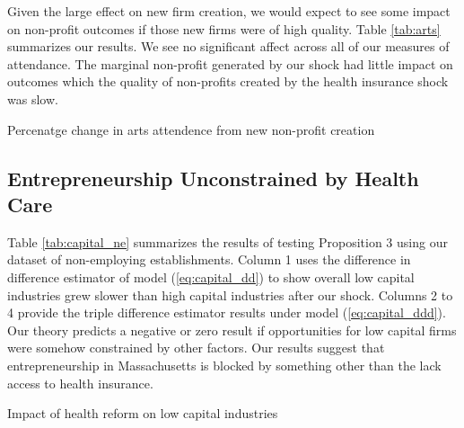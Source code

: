 \documentclass[12pt]{article}
\begin{document}
Given the large effect on new firm creation, we would expect to see some impact on non-profit outcomes if those new firms were of high quality. Table \ref{tab:arts} summarizes our results. We see no significant affect across all of our measures of attendance. The marginal non-profit generated by our shock had little impact on outcomes which the quality of non-profits created by the health insurance shock was slow. 

\begin{table}[H]
	\footnotesize
	\centering
	\caption{Percenatge change in arts attendence from new non-profit creation}
	
	\label{tab:arts}
\end{table}

\subsection{Entrepreneurship Unconstrained by Health Care}

Table \ref{tab:capital_ne} summarizes the results of testing Proposition 3 using our dataset of non-employing establishments. Column 1 uses the difference in difference estimator of model (\ref{eq:capital_dd}) to show overall low capital industries grew slower than high capital industries after our shock. Columns 2 to 4 provide the triple difference estimator results under model (\ref{eq:capital_ddd}). Our theory predicts a negative or zero result if opportunities for low capital firms were somehow constrained by other factors. Our results suggest that entrepreneurship in Massachusetts is blocked by something other than the lack access to health insurance. 


\begin{comment}
We next turn to Proposition 4 which provides us with more statistical accuracy if the shock's impact was short lived. Column 2 of table \ref{tab:capital_ne_ext} shows a significant effect under the triple difference model of model (7) with other New England states as a control. The result is not robust to other controls as we see in Column 3 and Column 4. 
\end{comment}

\begin{table}[H]
    \footnotesize
	\centering
	\caption{Impact of health reform on low capital industries}
	
	\label{tab:capital_ne}
\end{table} 
\end{document}
